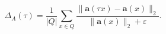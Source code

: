 \begin{equation}
\Delta_A(\tau)=\frac{1}{|Q|}\sum_{x\in Q}\frac{\|\mathbf a(\tau x)-\mathbf a(x)\|_2}{\|\mathbf a(x)\|_2+\varepsilon}.
\label{eq:formal_perturbation_change}
\tag{9}
\end{equation}
